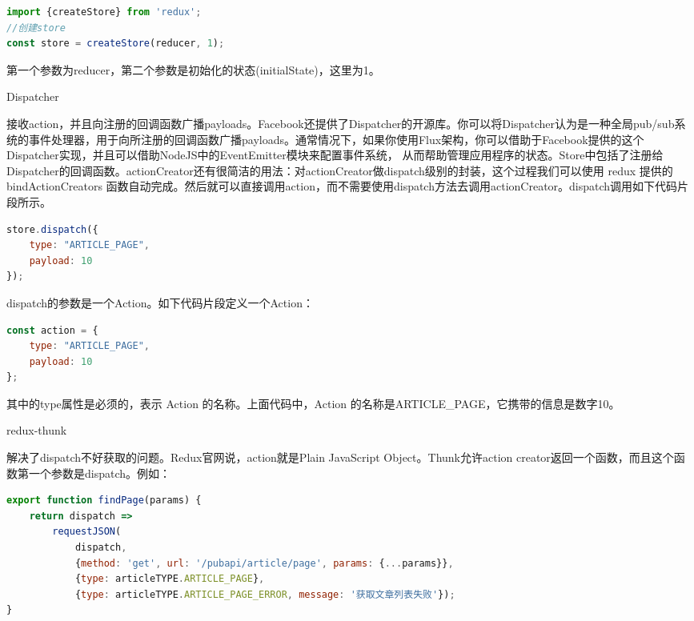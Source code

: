 \documentclass[12pt]{book}
\makeatletter
\numberwithin{dummy}{section}
\theoremstyle{ocrenumbox}
\theoremstyle{blacknumex}
\theoremstyle{blacknumbox}
\theoremstyle{ocrenum}
\renewcommand{\subsection}{\@startsection {subsection}{2}{\z@}
	{-3ex \@plus -0.1ex \@minus -.4ex}
	{0.5ex \@plus.2ex }
	{\normalfont\sffamily\bfseries}}
\renewcommand\paragraph{\@startsection{paragraph}{4}{\z@}
	{-2ex \@plus-.2ex \@minus .2ex}
	{.1ex}
	{\normalfont\small\sffamily\bfseries}}
\makeatother
\begin{document}
\begin{lstlisting}[language=Javascript]
import {createStore} from 'redux';
//创建store
const store = createStore(reducer, 1);
\end{lstlisting}

第一个参数为reducer，第二个参数是初始化的状态(initialState)，这里为1。

\subsection{Dispatcher}

接收action，并且向注册的回调函数广播payloads。Facebook还提供了Dispatcher的开源库。你可以将Dispatcher认为是一种全局pub/sub系统的事件处理器，用于向所注册的回调函数广播payloads。通常情况下，如果你使用Flux架构，你可以借助于Facebook提供的这个Dispatcher实现，并且可以借助NodeJS中的EventEmitter模块来配置事件系统， 从而帮助管理应用程序的状态。Store中包括了注册给Dispatcher的回调函数。actionCreator还有很简洁的用法：对actionCreator做dispatch级别的封装，这个过程我们可以使用 redux 提供的 bindActionCreators 函数自动完成。然后就可以直接调用action，而不需要使用dispatch方法去调用actionCreator。dispatch调用如下代码片段所示。

\begin{lstlisting}[language=Javascript]
store.dispatch({
	type: "ARTICLE_PAGE",
	payload: 10
});
\end{lstlisting}

dispatch的参数是一个Action。如下代码片段定义一个Action：

\begin{lstlisting}[language=Javascript]
const action = {
	type: "ARTICLE_PAGE",
	payload: 10
};
\end{lstlisting}

其中的type属性是必须的，表示 Action 的名称。上面代码中，Action 的名称是ARTICLE\_PAGE，它携带的信息是数字10。

\paragraph{redux-thunk}

解决了dispatch不好获取的问题。Redux官网说，action就是Plain JavaScript Object。Thunk允许action creator返回一个函数，而且这个函数第一个参数是dispatch。例如：

\begin{lstlisting}[language=Javascript]
export function findPage(params) {
	return dispatch =>
		requestJSON(
			dispatch,
			{method: 'get', url: '/pubapi/article/page', params: {...params}},
			{type: articleTYPE.ARTICLE_PAGE},
			{type: articleTYPE.ARTICLE_PAGE_ERROR, message: '获取文章列表失败'});
}
\end{lstlisting}
\end{document}
